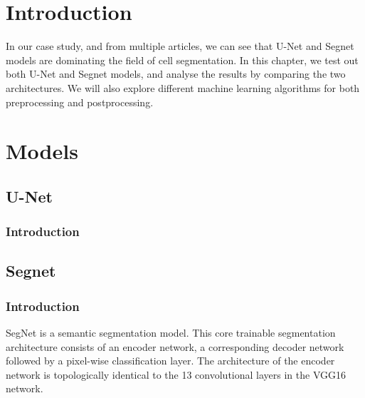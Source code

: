 \section{Introduction}
\vspace{0.2in}
\hspace*{0.16in}
In our case study, and from multiple articles, we can see that U-Net and Segnet models are dominating the field of cell segmentation.
In this chapter, we test out both U-Net and Segnet models, and analyse the results by comparing the two architectures.
We will also explore different machine learning algorithms for both preprocessing and postprocessing.

\section{Models}
\vspace{0.2in}
\hspace*{0.16in}
\lipsum[3-3]

\subsection{U-Net}
\subsubsection{Introduction}
\lipsum[2-2]

\subsection{Segnet}
\subsubsection{Introduction}
SegNet is a semantic segmentation model. This core trainable segmentation architecture consists of an encoder network, a corresponding decoder network followed by a pixel-wise classification layer. The architecture of the encoder network is topologically identical to the 13 convolutional layers in the VGG16 network. \textsuperscript{\cite{badrinarayanan2017segnet}}

